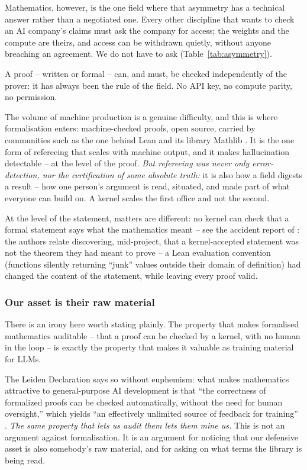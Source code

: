 \documentclass[11pt, a4paper,twosided]{amsart}
\newcommand{\key}[1]{\emph{#1}}
\begin{document}
Mathematics, however, is the one field where that asymmetry has a technical answer rather than a negotiated one. Every other discipline that wants to check an AI company's claims must ask the company for access; the weights and the compute are theirs, and access can be withdrawn quietly, without anyone breaching an agreement. We do not have to ask (Table~\ref{tab:asymmetry}).

\begin{pullquote}
A proof -- written or formal -- can, and must, be checked independently of the prover: it has always been the rule of the field. No API key, no compute parity, no permission.
\end{pullquote}

The volume of machine production is a genuine difficulty, and this is where formalisation enters: machine-checked proofs, open source, carried by communities such as the one behind Lean and its library Mathlib \cite{ML20}. It is the one form of refereeing that scales with machine output, and it makes hallucination detectable -- at the level of the proof. \emph{But refereeing was never only error-detection, nor the certification of some absolute truth:} it is also how a field digests a result -- how one person's argument is read, situated, and made part of what everyone can build on. A kernel scales the first office and not the second.


At the level of the statement, matters are different: no kernel can check that a formal statement says what the mathematics meant -- see the accident report of \cite[\S~5]{LS25}: the authors relate discovering, mid-project, that a kernel-accepted statement was not the theorem they had meant to prove -- a Lean evaluation convention (functions silently returning ``junk'' values outside their domain of definition) had changed the content of the statement, while leaving every proof valid.

\subsubsection{Our asset is their raw material}

There is an irony here worth stating plainly. The property that makes formalised mathematics auditable -- that a proof can be checked by a kernel, with no human in the loop -- is exactly the property that makes it valuable as training material for LLMs. 

The Leiden Declaration says so without euphemism: what makes mathematics attractive to general-purpose AI development is that ``the correctness of formalized proofs can be checked automatically, without the need for human oversight,'' which yields ``an effectively unlimited source of feedback for training'' \cite{leiden2026}. \key{The same property that lets us audit them lets them mine us.} This is not an argument against formalisation. It is an argument for noticing that our defensive asset is also somebody's raw material, and for asking on what terms the library is being read.
\end{document}
